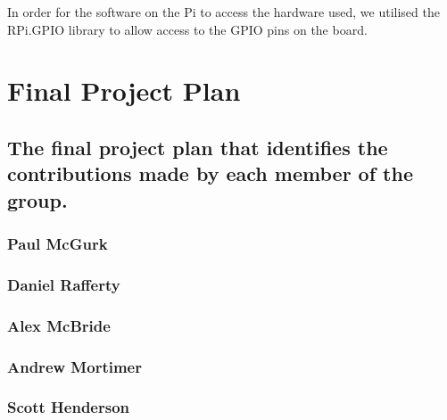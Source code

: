 \documentclass[10pt]{article}
\begin{document}
In order for the software on the Pi to access the hardware used, we utilised the RPi.GPIO library to allow access to the GPIO pins on the board.

\section{Final Project Plan}
\subsection{The final project plan that identifies the contributions made by each member of the group.}
\subsubsection{Paul McGurk}
\subsubsection{Daniel Rafferty}
\subsubsection{Alex McBride}
\subsubsection{Andrew Mortimer}
\subsubsection{Scott Henderson}
\end{document}
